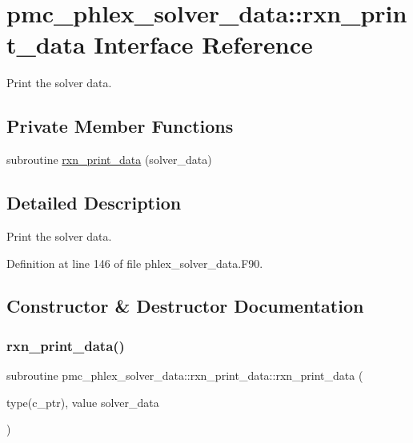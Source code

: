 \hypertarget{interfacepmc__phlex__solver__data_1_1rxn__print__data}{}\section{pmc\+\_\+phlex\+\_\+solver\+\_\+data\+:\+:rxn\+\_\+print\+\_\+data Interface Reference}
\label{interfacepmc__phlex__solver__data_1_1rxn__print__data}


Print the solver data.  


\subsection*{Private Member Functions}
\begin{DoxyCompactItemize}
\item 
subroutine \mbox{\hyperlink{interfacepmc__phlex__solver__data_1_1rxn__print__data_a864b9db7a9c309c2ab1b6d6f32d72468}{rxn\+\_\+print\+\_\+data}} (solver\+\_\+data)
\end{DoxyCompactItemize}


\subsection{Detailed Description}
Print the solver data. 

Definition at line 146 of file phlex\+\_\+solver\+\_\+data.\+F90.



\subsection{Constructor \& Destructor Documentation}
\mbox{\label{interfacepmc__phlex__solver__data_1_1rxn__print__data_a864b9db7a9c309c2ab1b6d6f32d72468}} 
\subsubsection{\texorpdfstring{rxn\+\_\+print\+\_\+data()}{rxn\_print\_data()}}
{\footnotesize\ttfamily subroutine pmc\+\_\+phlex\+\_\+solver\+\_\+data\+::rxn\+\_\+print\+\_\+data\+::rxn\+\_\+print\+\_\+data (\begin{DoxyParamCaption}\item[{type(c\+\_\+ptr), value}]{solver\+\_\+data }\end{DoxyParamCaption})\hspace{0.3cm}{\ttfamily [private]}}


